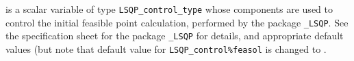 \begin{description}
 is a scalar variable of type 
{\tt LSQP\_control\_type}
whose components are used to control the initial feasible point calculation,
performed by the package 
{\tt \libraryname\_LSQP}. 
See the specification sheet for the package 
{\tt \libraryname\_LSQP} 
for details, and appropriate default values (but note that default value for 
{\tt LSQP\_control\%feasol} is changed to \false.

\end{description}
